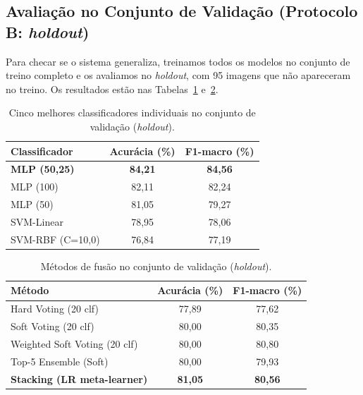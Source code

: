 \documentclass[12pt]{article}
\begin{document}
\subsection{Avaliação no Conjunto de Validação (Protocolo B: \textit{holdout})}

Para checar se o sistema generaliza, treinamos todos os modelos no conjunto de
treino completo e os avaliamos no \textit{holdout}, com 95 imagens que não
apareceram no treino. Os resultados estão nas Tabelas~\ref{tab:ind-val}
e~\ref{tab:fusao-val}.

\begin{table}[H]
\centering
\caption{Cinco melhores classificadores individuais no conjunto de validação
(\textit{holdout}).}
\label{tab:ind-val}
\begin{tabular}{lcc}
\toprule
Classificador & Acurácia (\%) & F1-macro (\%) \\
\midrule
\textbf{MLP (50,25)}   & \textbf{84,21} & \textbf{84,56} \\
MLP (100)              & 82,11 & 82,24 \\
MLP (50)               & 81,05 & 79,27 \\
SVM-Linear             & 78,95 & 78,06 \\
SVM-RBF (C=10,0)       & 76,84 & 77,19 \\
\bottomrule
\end{tabular}
\end{table}

\begin{table}[H]
\centering
\caption{Métodos de fusão no conjunto de validação (\textit{holdout}).}
\label{tab:fusao-val}
\begin{tabular}{lcc}
\toprule
Método & Acurácia (\%) & F1-macro (\%) \\
\midrule
Hard Voting (20 clf)          & 77,89 & 77,62 \\
Soft Voting (20 clf)          & 80,00 & 80,35 \\
Weighted Soft Voting (20 clf) & 80,00 & 80,80 \\
Top-5 Ensemble (Soft)         & 80,00 & 79,93 \\
\textbf{Stacking (LR meta-learner)} & \textbf{81,05} & \textbf{80,56} \\
\bottomrule
\end{tabular}
\end{table}
\end{document}
